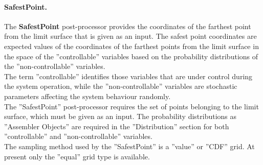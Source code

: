 \paragraph{SafestPoint.}
\label{SafestPoint}
The \textbf{SafestPoint} post-processor provides the coordinates of the farthest
point from the limit surface that is given as an input.
%
The safest point coordinates are expected values of the coordinates of the
farthest points from the limit surface in the space of the ''controllable''
variables based on the probability distributions of the ''non-controllable''
variables.
%
\\The term ''controllable'' identifies those variables that are under control
during the system operation, while the ''non-controllable'' variables are
stochastic parameters affecting the system behaviour randomly.
%
\\The ''SafestPoint'' post-processor requires the set of points belonging to the
limit surface, which must be given as an input.
%
The probability distributions as ''Assembler Objects'' are required in the
''Distribution'' section for both ''controllable'' and ''non-controllable''
variables.
%
\\The sampling method used by the ''SafestPoint'' is a ''value'' or ''CDF''
grid.
%
At present only the ''equal'' grid type is available.
%
